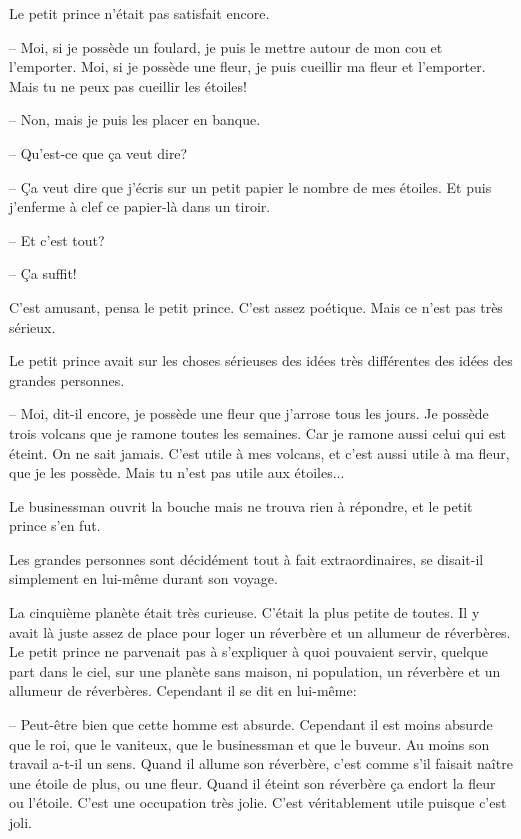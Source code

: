 \documentclass[a4paper]{report}
\begin{document}
Le petit prince n'était pas satisfait encore.

-- Moi, si je possède un foulard, je puis le mettre autour de mon cou et l'emporter. Moi, si je possède une fleur, je puis cueillir ma fleur et l'emporter. Mais tu ne peux pas cueillir les étoiles!

-- Non, mais je puis les placer en banque.

-- Qu'est-ce que ça veut dire?

-- Ça veut dire que j'écris sur un petit papier le nombre de mes étoiles. Et puis j'enferme à clef ce papier-là dans un tiroir.

-- Et c'est tout?

-- Ça suffit!

C'est amusant, pensa le petit prince. C'est assez poétique. Mais ce n'est pas très sérieux.

Le petit prince avait sur les choses sérieuses des idées très différentes des idées des grandes personnes.

-- Moi, dit-il encore, je possède une fleur que j'arrose tous les jours. Je possède trois volcans que je ramone toutes les semaines. Car je ramone aussi celui qui est éteint. On ne sait jamais. C'est utile à mes volcans, et c'est aussi utile à ma fleur, que je les possède. Mais tu n'est pas utile aux étoiles...

Le businessman ouvrit la bouche mais ne trouva rien à répondre, et le petit prince s'en fut.

Les grandes personnes sont décidément tout à fait extraordinaires, se disait-il simplement en lui-même durant son voyage.

\parachapter[XIV]{} %
La cinquième planète était très curieuse. C'était la plus petite de toutes. Il y avait là juste assez de place pour loger un réverbère et un allumeur de réverbères. Le petit prince ne parvenait pas à s'expliquer à quoi pouvaient servir, quelque part dans le ciel, sur une planète sans maison, ni population, un réverbère et un allumeur de réverbères. Cependant il se dit en lui-même:

--  Peut-être bien que cette homme est absurde. Cependant il est moins absurde que le roi, que le vaniteux, que le businessman et que le buveur. Au moins son travail a-t-il un sens. Quand il allume son réverbère, c'est comme s'il faisait naître une étoile de plus, ou une fleur. Quand il éteint son réverbère ça endort la fleur ou l'étoile. C'est une occupation très jolie. C'est véritablement utile puisque c'est joli.
\end{document}

